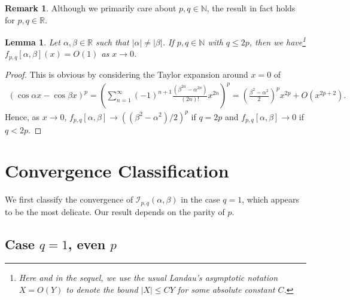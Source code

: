 \documentclass[12pt, reqno]{amsart}
\theoremstyle{plain}
\newtheorem{lemma}[theorem]{Lemma}
\theoremstyle{definition}
\newtheorem{remark}[theorem]{Remark}
\begin{document}
\begin{remark}
    Although we primarily care about $p, q\in\mathbb{N}$,  the result in fact holds for  $p, q\in\mathbb{R}$.
\end{remark}

\begin{lemma}\label{boundary0}
    Let $\alpha, \beta\in\mathbb{R}$ such that $|\alpha|\ne|\beta|$. If $p, q\in\mathbb{N}$ with $q\le 2p$, then we have\footnote{Here and in the sequel, we use the usual Landau's asymptotic notation $X=O(Y)$ to denote the bound $|X|\le CY$ for some absolute constant $C$.} $f_{p, q}[\alpha, \beta](x)=O(1)$ as $x\to 0$.
\end{lemma}
\begin{proof}
This is obvious by considering the Taylor expansion around $x=0$ of
\begin{align*}
    (\cos \alpha x-\cos\beta x)^p=\left(\sum_{n=1}^{\infty}(-1)^{n+1}\frac{(\beta^{2n}-\alpha^{2n})}{(2n)!}x^{2n}\right)^p=\left(\frac{\beta^2-\alpha^2}{2}\right)^px^{2p}+O(x^{2p+2}).
\end{align*}
Hence, as $x\to 0$, $f_{p, q}[\alpha, \beta]\to((\beta^2-\alpha^2)/2)^p$ if $q=2p$ and $f_{p, q}[\alpha, \beta]\to0$ if $q<2p$.
\end{proof}

\section{Convergence Classification}\label{sec3}

We first classify the convergence of $\mathcal{I}_{p, q}(\alpha, \beta)$ in the case $q=1$, which appears to be the most delicate. Our result depends on the parity of $p$. 


\subsection{Case $q=1$, even $p$}



\end{document}
